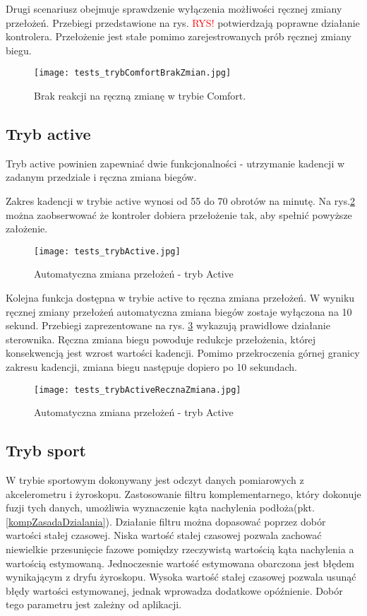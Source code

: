 Drugi scenariusz obejmuje sprawdzenie wyłączenia możłiwości ręcznej zmiany przełożeń. Przebiegi przedstawione na rys. \textcolor{red}{RYS!} potwierdzają poprawne działanie kontrolera. Przełożenie jest stałe pomimo zarejestrowanych prób ręcznej zmiany biegu.
\begin{figure}[h]
    \centering
    \texttt{[image: tests\_trybComfortBrakZmian.jpg]}
    \caption{Brak reakcji na ręczną zmianę w trybie Comfort.}
    \label{fig:tests_noChange}
\end{figure}

\subsection{Tryb active}

Tryb active powinien zapewniać dwie funkcjonalności - utrzymanie kadencji w zadanym przedziale i ręczna zmiana biegów.

Zakres kadencji w trybie active wynosi od 55 do 70 obrotów na minutę. Na rys.\ref{fig:tests_active} można zaobserwować że kontroler dobiera  przełożenie tak, aby spełnić powyższe założenie.
\begin{figure}[h]
    \centering
    \texttt{[image: tests\_trybActive.jpg]}
    \caption{Automatyczna zmiana przełożeń - tryb Active}
    \label{fig:tests_active}
\end{figure}

Kolejna funkcja dostępna w trybie active to ręczna zmiana przełożeń. W wyniku ręcznej zmiany przełożeń automatyczna zmiana biegów zostaje wyłączona na 10 sekund. Przebiegi zaprezentowane na rys. \ref{fig:tests_activeReczna} wykazują prawidłowe działanie sterownika. Ręczna zmiana biegu powoduje redukcje przełożenia, której konsekwencją jest wzrost wartości kadencji. Pomimo przekroczenia górnej granicy zakresu kadencji, zmiana biegu następuje dopiero po 10 sekundach.    
\begin{figure}[h]
    \centering
    \texttt{[image: tests\_trybActiveRecznaZmiana.jpg]}
    \caption{Automatyczna zmiana przełożeń - tryb Active}
    \label{fig:tests_activeReczna}
\end{figure}
\subsection{Tryb sport}
W trybie sportowym dokonywany jest odczyt danych pomiarowych z akcelerometru i żyroskopu. Zastosowanie filtru komplementarnego, który dokonuje fuzji tych danych, umożliwia wyznaczenie kąta nachylenia podłoża(pkt.\ref{kompZasadaDzialania}). Działanie filtru można dopasować poprzez dobór wartości stałej czasowej. Niska wartość stałej czasowej pozwala zachować niewielkie przesunięcie fazowe pomiędzy rzeczywistą wartością kąta nachylenia a wartością estymowaną. Jednoczesnie wartość estymowana obarczona jest błędem wynikającym z dryfu żyroskopu. Wysoka wartość stałej czasowej pozwala usunąć błędy wartości estymowanej, jednak wprowadza dodatkowe opóźnienie. Dobór tego parametru jest zależny od aplikacji.

